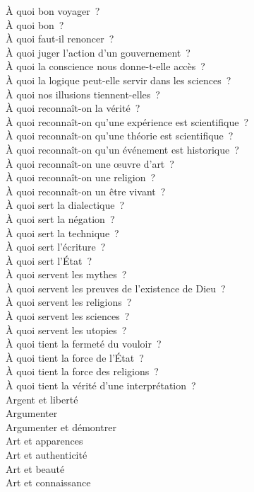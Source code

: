 \documentclass[a4paper,12pt]{article}
\begin{document}
À quoi bon voyager ? \\
À quoi bon ? \\
À quoi faut-il renoncer ? \\
À quoi juger l'action d'un gouvernement ? \\
À quoi la conscience nous donne-t-elle accès ? \\
À quoi la logique peut-elle servir dans les sciences ? \\
À quoi nos illusions tiennent-elles ? \\
À quoi reconnaît-on la vérité ? \\
À quoi reconnaît-on qu'une expérience est scientifique ? \\
À quoi reconnaît-on qu'une théorie est scientifique ? \\
À quoi reconnaît-on qu'un événement est historique ? \\
À quoi reconnaît-on une œuvre d'art ? \\
À quoi reconnaît-on une religion ? \\
À quoi reconnaît-on un être vivant ? \\
À quoi sert la dialectique ? \\
À quoi sert la négation ? \\
À quoi sert la technique ? \\
À quoi sert l'écriture ? \\
À quoi sert l'État ? \\
À quoi servent les mythes ? \\
À quoi servent les preuves de l'existence de Dieu ? \\
À quoi servent les religions ? \\
À quoi servent les sciences ? \\
À quoi servent les utopies ? \\
À quoi tient la fermeté du vouloir ? \\
À quoi tient la force de l'État ? \\
À quoi tient la force des religions ? \\
À quoi tient la vérité d'une interprétation ? \\
Argent et liberté \\
Argumenter \\
Argumenter et démontrer \\
Art et apparences \\
Art et authenticité \\
Art et beauté \\
Art et connaissance \\
\end{document}

